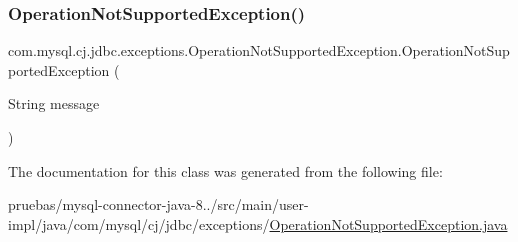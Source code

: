\mbox{\label{classcom_1_1mysql_1_1cj_1_1jdbc_1_1exceptions_1_1_operation_not_supported_exception_af652fea5842cc87244697e774eb64197}} 
\subsubsection{\texorpdfstring{Operation\+Not\+Supported\+Exception()}{OperationNotSupportedException()}\hspace{0.1cm}{\footnotesize\ttfamily [2/2]}}
{\footnotesize\ttfamily com.\+mysql.\+cj.\+jdbc.\+exceptions.\+Operation\+Not\+Supported\+Exception.\+Operation\+Not\+Supported\+Exception (\begin{DoxyParamCaption}\item[{String}]{message }\end{DoxyParamCaption})}



The documentation for this class was generated from the following file\+:\begin{DoxyCompactItemize}
\item 
pruebas/mysql-\/connector-\/java-\/8../src/main/user-\/impl/java/com/mysql/cj/jdbc/exceptions/\mbox{\hyperlink{_operation_not_supported_exception_8java}{Operation\+Not\+Supported\+Exception.\+java}}\end{DoxyCompactItemize}
